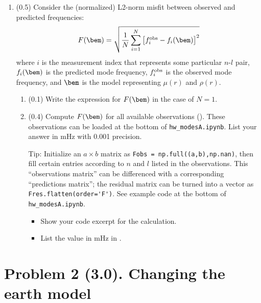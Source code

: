 \documentclass[11pt,titlepage,fleqn]{article}
\newcommand{\tfilemain}{{\tt hw\_modesA.ipynb}}
\begin{document}
\begin{enumerate}
\item (0.5) Consider the (normalized) L2-norm misfit between observed and predicted frequencies:
%
\begin{equation}
F(\bem) = \sqrt{ \frac{1}{N} \sum_{i=1}^N \left[f_i^{\rm obs} - f_i(\bem)\right]^2 }
\label{Fm}
\end{equation}
%
where $i$ is the measurement index that represents some particular $n$-$l$ pair, $f_i(\bem)$ is the predicted mode frequency, $f_i^{\rm obs}$ is the observed mode frequency, and $\bem$ is the model representing $\mu(r)$ and $\rho(r)$.

\begin{enumerate}
\item (0.1) Write the expression for $F(\bem)$ in the case of $N=1$.

\item (0.4) Compute $F(\bem)$ for all available observations (). These observations can be loaded at the bottom of \tfilemain. List your answer in mHz with 0.001 precision.

Tip: Initialize an $a \times b$ matrix as \verb+Fobs = np.full((a,b),np.nan)+, then fill certain entries according to $n$ and $l$ listed in the observations. This ``observations matrix'' can be differenced with a corresponding ``predictions matrix''; the residual matrix can be turned into a vector as \verb+Fres.flatten(order='F')+. See example code at the bottom of \tfilemain.

\begin{itemize}
\item Show your code excerpt for the calculation.
\item List the value in mHz in .
\end{itemize}

\end{enumerate}

\label{prob:Fm}

\end{enumerate}


\section*{Problem 2 (3.0). Changing the earth model}
\end{document}
